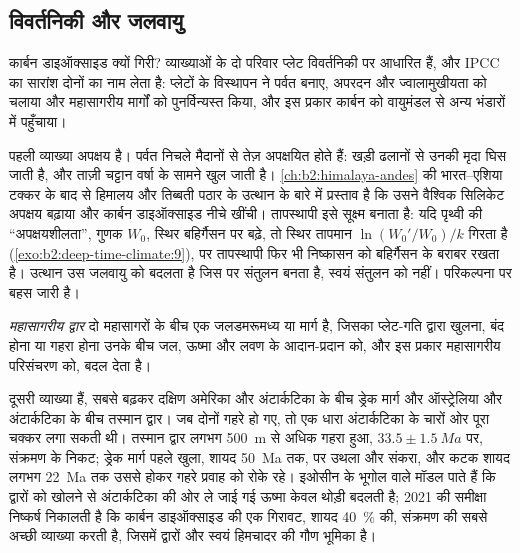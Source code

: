 \subsection*{विवर्तनिकी और जलवायु}

कार्बन डाइऑक्साइड क्यों गिरी? व्याख्याओं के दो परिवार प्लेट विवर्तनिकी पर आधारित हैं, और IPCC का
सारांश दोनों का नाम लेता है: प्लेटों के विस्थापन ने पर्वत बनाए, अपरदन और ज्वालामुखीयता को चलाया और
महासागरीय मार्गों को पुनर्विन्यस्त किया, और इस प्रकार कार्बन को वायुमंडल से अन्य भंडारों में पहुँचाया।

पहली व्याख्या अपक्षय है। पर्वत निचले मैदानों से तेज़ अपक्षयित होते हैं: खड़ी ढलानों से उनकी मृदा
घिस जाती है, और ताज़ी चट्टान वर्षा के सामने खुल जाती है। \cref{ch:b2:himalaya-andes} की
भारत--एशिया टक्कर के बाद से हिमालय और तिब्बती पठार के उत्थान के बारे में प्रस्ताव है कि उसने वैश्विक
सिलिकेट अपक्षय बढ़ाया और कार्बन डाइऑक्साइड नीचे खींची। तापस्थापी इसे सूक्ष्म बनाता है: यदि
पृथ्वी की ``अपक्षयशीलता'', गुणक $W_0$, स्थिर बहिर्गैसन पर बढ़े, तो स्थिर तापमान
$\ln(W_0'/W_0)/k$ गिरता है (\cref{exo:b2:deep-time-climate:9}), पर तापस्थापी फिर भी
निष्कासन को बहिर्गैसन के बराबर रखता है। उत्थान उस जलवायु को बदलता है जिस पर संतुलन बनता है,
स्वयं संतुलन को नहीं। परिकल्पना पर बहस जारी है।

\begin{definition}[महासागरीय द्वार]\label{def:b2:deep-time-climate:gateway}
\emph{महासागरीय द्वार} दो महासागरों के बीच एक जलडमरूमध्य या मार्ग है, जिसका
प्लेट-गति द्वारा खुलना, बंद होना या गहरा होना उनके बीच जल, ऊष्मा और लवण के आदान-प्रदान को, और
इस प्रकार महासागरीय परिसंचरण को, बदल देता है।
\end{definition}

दूसरी व्याख्या  हैं, सबसे बढ़कर दक्षिण अमेरिका और अंटार्कटिका के बीच ड्रेक मार्ग
और ऑस्ट्रेलिया और अंटार्कटिका के बीच तस्मान द्वार। जब दोनों गहरे हो गए, तो एक धारा
अंटार्कटिका के चारों ओर पूरा चक्कर लगा सकती थी। तस्मान द्वार लगभग \qty{500}{m} से अधिक गहरा हुआ, $33.5 \pm
\qty{1.5}{Ma}$ पर, संक्रमण के निकट; ड्रेक मार्ग पहले खुला, शायद \qty{50}{Ma} तक,
पर उथला और संकरा, और कटक शायद लगभग \qty{22}{Ma} तक उससे होकर गहरे प्रवाह को रोके रहे। इओसीन
के भूगोल वाले मॉडल पाते हैं कि द्वारों को खोलने से अंटार्कटिका की ओर ले जाई गई ऊष्मा केवल
थोड़ी बदलती है; 2021 की समीक्षा निष्कर्ष निकालती है कि कार्बन डाइऑक्साइड की एक गिरावट, शायद
\qty{40}{\percent} की, संक्रमण की सबसे अच्छी व्याख्या करती है, जिसमें द्वारों और स्वयं हिमचादर की
गौण भूमिका है।

